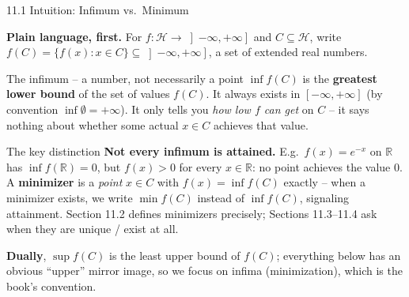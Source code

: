 \documentclass[aspectratio=169,10pt]{beamer}
\newcommand{\mHH}{\mathcal H}
\newcommand{\R}{\mathbb{R}}
\begin{document}
\begin{frame}{11.1 Intuition: Infimum vs.\ Minimum}

  \textbf{Plain language, first.} For $f:\mHH\to\left]-\infty,+\infty\right]$
  and $C\subseteq\mHH$, write $f(C)=\{f(x):x\in C\}\subseteq\left]-\infty,+\infty\right]$,
  a set of extended real numbers.

  \begin{block}{The infimum -- a number, not necessarily a point}
    $\inf f(C)$ is the \textbf{greatest lower bound} of the set of
    values $f(C)$. It always exists in $[-\infty,+\infty]$ (by
    convention $\inf\emptyset=+\infty$). It only tells you \emph{how
    low $f$ can get} on $C$ -- it says nothing about whether some
    actual $x\in C$ achieves that value.
  \end{block}

  \begin{alertblock}{The key distinction}
    \textbf{Not every infimum is attained.} E.g.\ $f(x)=e^{-x}$ on
    $\R$ has $\inf f(\R)=0$, but $f(x)>0$ for every $x\in\R$: no
    point achieves the value $0$. A \textbf{minimizer} is a
    \emph{point} $x\in C$ with $f(x)=\inf f(C)$ exactly -- when a
    minimizer exists, we write $\min f(C)$ instead of $\inf f(C)$,
    signaling attainment. Section 11.2 defines minimizers precisely;
    Sections 11.3--11.4 ask when they are unique / exist at all.
  \end{alertblock}

  \textbf{Dually}, $\sup f(C)$ is the least upper bound of $f(C)$;
  everything below has an obvious ``upper'' mirror image, so we focus
  on infima (minimization), which is the book's convention.

\end{frame}
\end{document}
